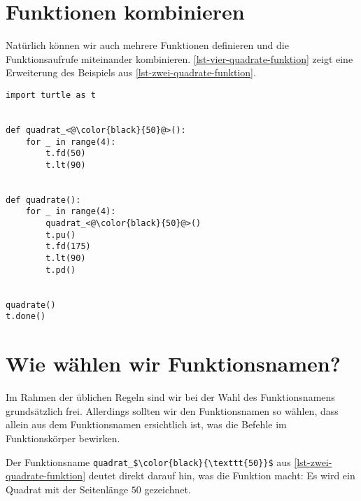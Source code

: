 \vspace{-0.85cm}

\section{Funktionen kombinieren}

Natürlich können wir auch mehrere Funktionen definieren und die Funktionsaufrufe miteinander kombinieren. \autoref{lst-vier-quadrate-funktion} zeigt eine Erweiterung des Beispiels aus \autoref{lst-zwei-quadrate-funktion}.

\begin{lstlisting}[language={python3}, caption={Zwei Funktionsdefinitionen. In der zweiten Funktionsdefinition wird die erste Funktion durch die Schleife mehrfach aufgerufen.}, label={lst-vier-quadrate-funktion}]
import turtle as t


def quadrat_<@\color{black}{50}@>():
	for _ in range(4):
		t.fd(50)
		t.lt(90)


def quadrate():
	for _ in range(4):
		quadrat_<@\color{black}{50}@>()
		t.pu()
		t.fd(175)
		t.lt(90)
		t.pd()


quadrate()
t.done()

\end{lstlisting}

\section{Wie wählen wir Funktionsnamen?}

Im Rahmen der üblichen Regeln sind wir bei der Wahl des Funktionsnamens grundsätzlich frei. Allerdings sollten wir den Funktionsnamen so wählen, dass allein aus dem Funktionsnamen ersichtlich ist, was die Befehle im Funktionskörper bewirken.


\begin{example}

Der Funktionsname \lstinline[language={python3}, mathescape]!quadrat_$\color{black}{\texttt{50}}$! aus \autoref{lst-zwei-quadrate-funktion} deutet direkt darauf hin, was die Funktion macht: Es wird ein Quadrat mit der Seitenlänge $50$ gezeichnet.

\end{example}

